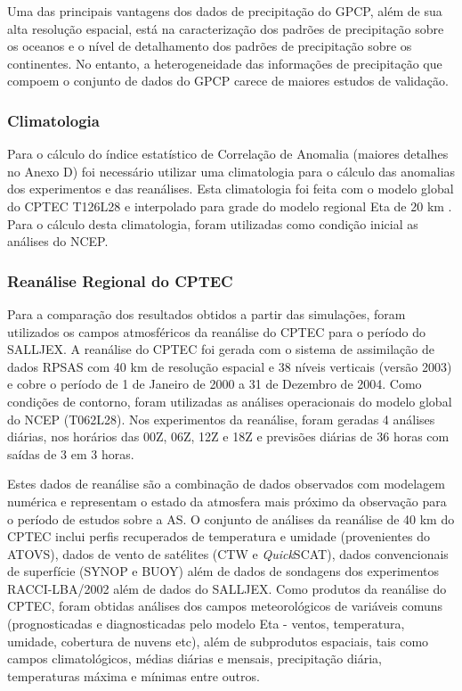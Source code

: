 Uma das principais vantagens dos dados de precipitação do GPCP, além de sua alta resolução espacial, está na caracterização dos padrões de precipitação sobre os oceanos e o nível de detalhamento dos padrões de precipitação sobre os continentes. No entanto, a heterogeneidade das informações de precipitação que compoem o conjunto de dados do GPCP carece de maiores estudos de validação.

\subsubsection{Climatologia}

Para o cálculo do índice estatístico de Correlação de Anomalia (maiores detalhes no Anexo D) foi necessário utilizar uma climatologia para o cálculo das anomalias dos experimentos e das reanálises. Esta climatologia foi feita com o modelo global do CPTEC T126L28 e interpolado para grade do modelo regional Eta de 20 km \cite{sapucci09}. Para o cálculo desta climatologia, foram utilizadas como condição inicial as análises do NCEP.

\subsubsection{Reanálise Regional do CPTEC}
    
Para a comparação dos resultados obtidos a partir das simulações, foram utilizados os campos atmosféricos da reanálise do CPTEC \cite{aravequiaetal07} para o período do SALLJEX. A reanálise do CPTEC foi gerada com o sistema de assimilação de dados RPSAS com 40 km de resolução espacial e 38 níveis verticais (versão 2003) e cobre o período de 1 de Janeiro de 2000 a 31 de Dezembro de 2004. Como condições de contorno, foram utilizadas as análises operacionais do modelo global do NCEP (T062L28). Nos experimentos da reanálise, foram geradas 4 análises diárias, nos horários das 00Z, 06Z, 12Z e 18Z e previsões diárias de 36 horas com saídas de 3 em 3 horas. 

Estes dados de reanálise são a combinação de dados observados com modelagem numérica e representam o estado da atmosfera mais próximo da observação para o período de estudos sobre a AS. O conjunto de análises da reanálise de 40 km do CPTEC inclui perfis recuperados de temperatura e umidade (provenientes do ATOVS), dados de vento de satélites (CTW e \textit{Quick}SCAT), dados convencionais de superfície (SYNOP e BUOY) além de dados de sondagens dos experimentos RACCI-LBA/2002 \cite{silvadiasetal03} além de dados do SALLJEX. Como produtos da reanálise do CPTEC, foram obtidas análises dos campos meteorológicos de variáveis comuns (prognosticadas e diagnosticadas pelo modelo Eta - ventos, temperatura, umidade, cobertura de nuvens etc), além de subprodutos espaciais, tais como campos climatológicos, médias diárias e mensais, precipitação diária, temperaturas máxima e mínimas entre outros.


